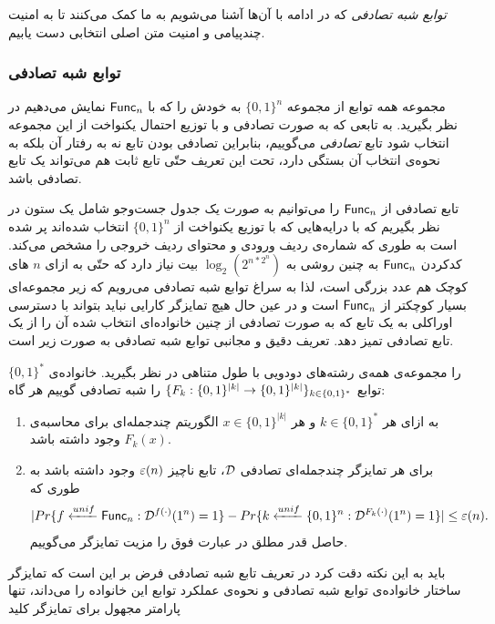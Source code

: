\textit{توابع شبه تصادفی}
که در ادامه با آن‌ها آشنا می‌شویم به ما کمک می‌کنند تا به امنیت چندپیامی و امنیت متن اصلی انتخابی دست یابیم.
\subsubsection*{توابع شبه تصادفی}
مجموعه‌  همه‌ توابع از مجموعه‌
$\{0,1 \}^n$
به خودش را که با
$\mathsf{Func}_{n}$
نمایش می‌دهیم در نظر بگیرید. به تابعی که به صورت تصادفی و با توزیع احتمال یکنواخت از این مجموعه انتخاب شود تابع 
\textit{تصادفی }
می‌گوییم، بنابراین تصادفی بودن تابع نه به رفتار آن بلکه به نحوه‌ی انتخاب آن بستگی دارد، تحت این تعریف حتّی تابع ثابت هم می‌تواند یک تابع تصادفی باشد. 

 تابع  تصادفی از 
 $\mathsf{Func}_{n}$
 را می‌توانیم به صورت یک جدول جست‌و‌جو
 شامل یک ستون در نظر بگیریم که با درایه‌هایی که با توزیع یکنواخت از  
 $\{0, 1\}^{n}$
 انتخاب شده‌اند پر شده است به طوری که شماره‌ی ردیف ورودی و محتوای ردیف خروجی را مشخص می‌کند. کدکردن 
 $\mathsf{Func}_{n}$
 به چنین روشی به 
 $\log_{2}(2^{n*2^{n}})$
 بیت نیاز دارد که حتّی به ازای 
 $n$
 های کوچک هم عدد بزرگی است، لذا به سراغ توابع شبه تصادفی
  می‌رویم که زیر مجموعه‌ای  بسیار کوچکتر از 
 $\mathsf{Func}_{n}$
 است و در عین حال هیچ تمایزگر کارایی نباید بتواند با دسترسی اوراکلی به یک تابع که به صورت تصادفی از چنین خانواده‌ای  انتخاب شده آن را از یک تابع تصادفی تمیز دهد. تعریف دقیق و مجانبی توابع شبه تصادفی به صورت زیر است.
\begin{definition}
$\{0, 1\}^{\ast}$
را مجموعه‌ی همه‌ی رشته‌های دودویی با طول متناهی در نظر بگیرید. خانواده‌ی توابع 
$\{F_{k}:\{0, 1\}^{|k|}\rightarrow \{0, 1\}^{|k|}\}_{k\in\{0, 1\}^{\ast}}$
را شبه تصادفی گوییم هر گاه:
\begin{enumerate}
\item
به ازای هر 
$k\in\{0, 1\}^{\ast}$
و هر 
$x\in\{0, 1\}^{|k|}$
 الگوریتم چندجمله‌ای برای محاسبه‌ی 
 $F_{k}(x)$
 وجود داشته باشد.
 \item
 برای هر تمایزگر چندجمله‌ای تصادفی  
 $\mathcal{D}$، 
  تابع ناچیز 
  $\varepsilon(n)$
  وجود داشته باشد به طوری که
  $$|Pr\{f\xleftarrow{{\tiny unif}}\mathsf{Func}_{n}: \mathcal{D}^{f(\cdot)}(1^{n}) = 1\} - Pr\{k\xleftarrow{{\tiny unif}}\{0, 1\}^{n}:  \mathcal{D}^{F_{k}(\cdot)}(1^{n}) = 1\}| \leq \varepsilon(n).$$
  حاصل قدر مطلق در عبارت فوق را مزیت
   تمایزگر می‌گوییم.
\end{enumerate}

\end{definition}
باید به این نکته دقت کرد در تعریف تابع شبه تصادفی فرض بر این است که تمایزگر ساختار خانواده‌ی توابع شبه تصادفی و نحوه‌ی عملکرد توابع این خانواده را می‌داند، تنها پارامتر مجهول برای تمایزگر کلید 
